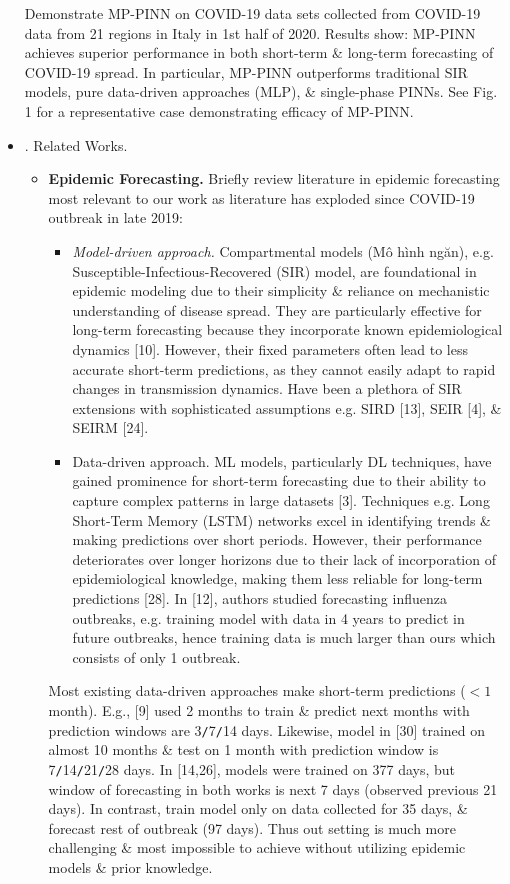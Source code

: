 \documentclass{article}
\begin{document}
\begin{itemize}
	Demonstrate MP-PINN on COVID-19 data sets collected from COVID-19 data from 21 regions in Italy in 1st half of 2020. Results show: MP-PINN achieves superior performance in both short-term \& long-term forecasting of COVID-19 spread. In particular, MP-PINN outperforms traditional SIR models, pure data-driven approaches (MLP), \& single-phase PINNs. See Fig. 1 for a representative case demonstrating efficacy of MP-PINN.
	\item {. Related Works.}
	\begin{itemize}
		\item {\bf Epidemic Forecasting.} Briefly review literature in epidemic forecasting most relevant to our work as literature has exploded since COVID-19 outbreak in late 2019:
		\begin{itemize}
			\item {\it Model-driven approach.} Compartmental models (Mô hình ngăn), e.g. Susceptible-Infectious-Recovered (SIR) model, are foundational in epidemic modeling due to their simplicity \& reliance on mechanistic understanding of disease spread. They are particularly effective for long-term forecasting because they incorporate known epidemiological dynamics [10]. However, their fixed parameters often lead to less accurate short-term predictions, as they cannot easily adapt to rapid changes in transmission dynamics. Have been a plethora of SIR extensions with sophisticated assumptions e.g. SIRD [13], SEIR [4],  \& SEIRM [24].
			\item {\sf Data-driven approach.} ML models, particularly DL techniques, have gained prominence for short-term forecasting due to their ability to capture complex patterns in large datasets [3]. Techniques e.g. Long Short-Term Memory (LSTM) networks excel in identifying trends \& making predictions over short periods. However, their performance deteriorates over longer horizons due to their lack of incorporation of epidemiological knowledge, making them less reliable for long-term predictions [28]. In [12], authors studied forecasting influenza outbreaks, e.g. training model with data in 4 years to predict in future outbreaks, hence training data is much larger than ours which consists of only 1 outbreak.
		\end{itemize}
		Most existing data-driven approaches make short-term predictions ($< 1$ month). E.g., [9] used 2 months to train \& predict next months with prediction windows are 3{\tt/}7{\tt/}14 days. Likewise, model in [30] trained on almost 10 months \& test on 1 month with prediction window is 7{\tt/}14{\tt/}21{\tt/}28 days. In [14,26], models were trained on 377 days, but window of forecasting in both works is next 7 days (observed previous 21 days). In contrast, train model only on data collected for 35 days, \& forecast rest of outbreak (97 days). Thus out setting is much more challenging \& most impossible to achieve without utilizing epidemic models \& prior knowledge.

\end{itemize}
\end{itemize}
\end{document}
